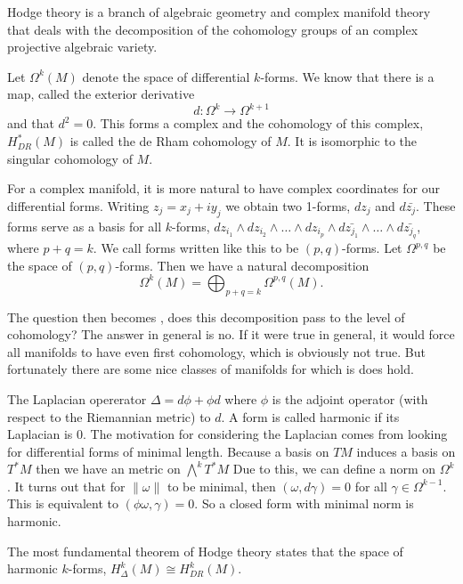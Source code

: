\documentclass[12pt]{article}
\begin{document}
Hodge theory is a branch of algebraic geometry and complex manifold theory that deals with the decomposition of the cohomology groups of an complex projective algebraic variety.

Let $\Omega^k(M)$ denote the space of differential $k$-forms. We know that there is a map, called the exterior derivative $$ d\colon\Omega^k \rightarrow \Omega^{k+1} $$ and that $d^2 = 0$. This forms a complex and the cohomology of this complex, $H_{DR}^* (M)$ is called the de Rham cohomology of $M$. It is isomorphic to the singular cohomology of $M$.

For a complex manifold, it is more natural to have complex coordinates for our differential forms. Writing $z_j = x_j + iy_j$ we obtain two 1-forms, $dz_j$ and $d\bar{z_j}$. These forms serve as a basis for all $k$-forms, $dz_{i_1} \wedge dz_{i_2} \wedge \dots\wedge dz_{i_p} \wedge d\bar{z_{j_1}} \wedge \dots \wedge d\bar{z_{j_q}}$, where $p+q = k$. We call forms written like this to be $(p,q)$-forms. Let $\Omega^{p,q}$ be the space of $(p,q)$-forms. Then we have a natural decomposition $$ \Omega^k (M) = \bigoplus _{p+q =k} \Omega^{p,q}(M).$$

The question then becomes , does this decomposition pass to the level of cohomology? The answer in general is no. If it were true in general, it would force all manifolds to have even first cohomology, which is obviously not true. But fortunately there are some nice classes of manifolds for which is does hold. 

The Laplacian opererator $\Delta = d \phi + \phi d$ where $\phi$ is the adjoint operator (with respect to the Riemannian metric) to $d$. A form is called harmonic if its Laplacian is 0. The motivation for considering the Laplacian comes from looking for differential forms of minimal length. Because a basis on $TM$ induces a basis on $T^*M$ then we have an metric on $\bigwedge^kT^*M$ Due to this, we can define a norm on $\Omega^k$. It turns out that for $\lVert \omega \rVert$ to be minimal, then $(\omega , d\gamma) = 0$ for all $\gamma \in \Omega^{k-1}$. This is equivalent to $(\phi \omega , \gamma ) = 0$. So a closed form with minimal norm is harmonic.

The most fundamental theorem of Hodge theory states that the space of harmonic $k$-forms, $H_{\Delta}^k(M) \cong H_{DR}^k (M)$.
\end{document}
